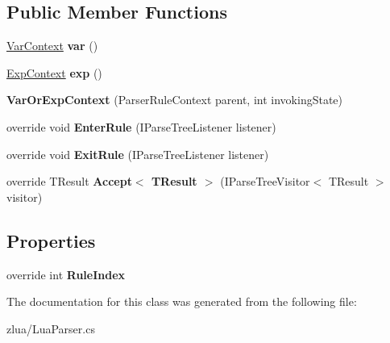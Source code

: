 \subsection*{Public Member Functions}
\begin{DoxyCompactItemize}
\item 
\mbox{\label{classzlua_1_1_lua_parser_1_1_var_or_exp_context_a8e9c0a3393388333f2372a74cc948aa0}} 
\mbox{\hyperlink{classzlua_1_1_lua_parser_1_1_var_context}{Var\+Context}} {\bfseries var} ()
\item 
\mbox{\label{classzlua_1_1_lua_parser_1_1_var_or_exp_context_ab3afd732862c93b8c362302eae834c80}} 
\mbox{\hyperlink{classzlua_1_1_lua_parser_1_1_exp_context}{Exp\+Context}} {\bfseries exp} ()
\item 
\mbox{\label{classzlua_1_1_lua_parser_1_1_var_or_exp_context_af486fb671b994e25a62a5415385b47a0}} 
{\bfseries Var\+Or\+Exp\+Context} (Parser\+Rule\+Context parent, int invoking\+State)
\item 
\mbox{\label{classzlua_1_1_lua_parser_1_1_var_or_exp_context_aefc783e37ebb5f1046d94f0671f31acd}} 
override void {\bfseries Enter\+Rule} (I\+Parse\+Tree\+Listener listener)
\item 
\mbox{\label{classzlua_1_1_lua_parser_1_1_var_or_exp_context_a4afff26d3175658b105b3ebd936a1df5}} 
override void {\bfseries Exit\+Rule} (I\+Parse\+Tree\+Listener listener)
\item 
\mbox{\label{classzlua_1_1_lua_parser_1_1_var_or_exp_context_afcd30ad0150ddef2ea99f12ba39ba0d7}} 
override T\+Result {\bfseries Accept$<$ T\+Result $>$} (I\+Parse\+Tree\+Visitor$<$ T\+Result $>$ visitor)
\end{DoxyCompactItemize}
\subsection*{Properties}
\begin{DoxyCompactItemize}
\item 
\mbox{\label{classzlua_1_1_lua_parser_1_1_var_or_exp_context_a6cabe4988ff1c5310b68667db0f91c45}} 
override int {\bfseries Rule\+Index}
\end{DoxyCompactItemize}


The documentation for this class was generated from the following file\+:\begin{DoxyCompactItemize}
\item 
zlua/Lua\+Parser.\+cs\end{DoxyCompactItemize}

